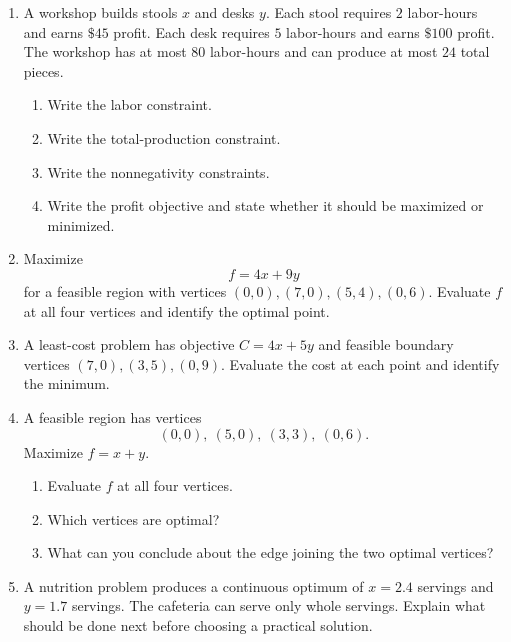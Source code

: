 \documentclass[11pt]{article}
\newcommand{\workmed}{\par\vspace{0.62in}}
\newcommand{\worklarge}{\par\vspace{0.92in}}
\newcommand{\workxl}{\par\vspace{1.22in}}
\begin{document}
\begin{enumerate}
\item A workshop builds stools \(x\) and desks \(y\). Each stool requires \(2\) labor-hours and earns \(\$45\) profit. Each desk requires \(5\) labor-hours and earns \(\$100\) profit. The workshop has at most \(80\) labor-hours and can produce at most \(24\) total pieces.
\begin{enumerate}[label=(\alph*),itemsep=4pt]
\item Write the labor constraint.
\item Write the total-production constraint.
\item Write the nonnegativity constraints.
\item Write the profit objective and state whether it should be maximized or minimized.
\end{enumerate}
\workxl

\item Maximize
\[
f=4x+9y
\]
for a feasible region with vertices \((0,0),(7,0),(5,4),(0,6)\). Evaluate \(f\) at all four vertices and identify the optimal point.
\worklarge

\item A least-cost problem has objective \(C=4x+5y\) and feasible boundary vertices \((7,0),(3,5),(0,9)\). Evaluate the cost at each point and identify the minimum.
\worklarge

\item A feasible region has vertices
\[
(0,0),\ (5,0),\ (3,3),\ (0,6).
\]
Maximize \(f=x+y\).
\begin{enumerate}[label=(\alph*),itemsep=4pt]
\item Evaluate \(f\) at all four vertices.
\item Which vertices are optimal?
\item What can you conclude about the edge joining the two optimal vertices?
\end{enumerate}
\worklarge

\item A nutrition problem produces a continuous optimum of \(x=2.4\) servings and \(y=1.7\) servings. The cafeteria can serve only whole servings. Explain what should be done next before choosing a practical solution.
\workmed
\end{enumerate}
\end{document}
